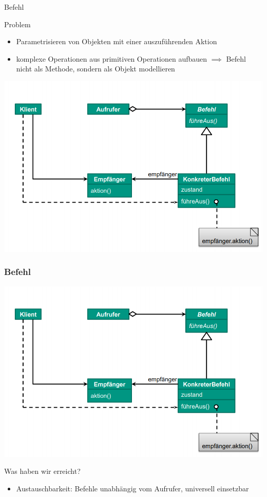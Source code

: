 \documentclass[18pt]{beamer}
\begin{document}
	\begin{frame}{Befehl}
		\begin{block}{Problem}
			\begin{itemize}
				\item Parametrisieren von Objekten mit einer auszuführenden Aktion \pause 
				\item komplexe Operationen aus primitiven Operationen aufbauen \pause
				\linebreak $\implies$ Befehl nicht als Methode, sondern als Objekt modellieren
			\end{itemize}
		\end{block}
		\pause
		\centering
		\includegraphics[scale=0.35]{./pics/tut4/command.png}
	\end{frame}

	\begin{frame}
		\frametitle{Befehl}
		\includegraphics[scale=0.35]{./pics/tut4/command.png}
		\begin{block}{Was haben wir erreicht?}
			\begin{itemize}
				 \pause
				\item Austauschbarkeit: Befehle unabhängig vom Aufrufer, universell einsetzbar
			\end{itemize}
		\end{block}
	\end{frame}
	
\end{document}
